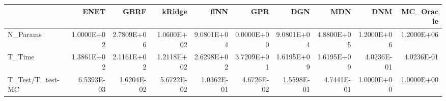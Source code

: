 \begin{tabular}{lrrrrrrrrr}
\toprule
{} &       ENET &       GBRF &     kRidge &       ffNN &        GPR &        DGN &        MDN &        DNM &  MC\_Oracle \\
\midrule
N\_Params         & 1.0000E+02 & 2.7809E+06 & 1.0600E+02 & 9.0801E+04 & 0.0000E+00 & 9.0801E+04 & 4.8800E+05 & 1.2000E+06 & 1.2000E+06 \\
T\_Time           & 1.3861E+02 & 2.1161E+02 & 1.2118E+02 & 2.6298E+02 & 3.7209E+01 & 1.6195E+09 & 1.6195E+09 & 4.0236E-01 & 4.0236E-01 \\
T\_Test/T\_test-MC & 6.5393E-03 & 1.6204E-02 & 5.6722E-02 & 1.0362E-01 & 4.6726E-02 & 1.5598E-01 & 4.7441E-01 & 1.0000E+00 & 1.0000E+00 \\
\bottomrule
\end{tabular}
